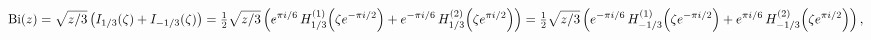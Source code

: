 \[\mathop{\mathrm{Bi}\/}\nolimits\!\left(z\right)=\sqrt{z/3}\left(\mathop{I_{1/3%
}\/}\nolimits\!\left(\zeta\right)+\mathop{I_{-1/3}\/}\nolimits\!\left(\zeta%
\right)\right)=\tfrac{1}{2}\sqrt{z/3}\left(e^{\pi i/6}\mathop{{H^{(1)}_{1/3}}%
\/}\nolimits\!\left(\zeta e^{-\pi i/2}\right)+e^{-\pi i/6}\mathop{{H^{(2)}_{1/%
3}}\/}\nolimits\!\left(\zeta e^{\pi i/2}\right)\right)=\tfrac{1}{2}\sqrt{z/3}%
\left(e^{-\pi i/6}\mathop{{H^{(1)}_{-1/3}}\/}\nolimits\!\left(\zeta e^{-\pi i/%
2}\right)+e^{\pi i/6}\mathop{{H^{(2)}_{-1/3}}\/}\nolimits\!\left(\zeta e^{\pi i%
/2}\right)\right),\]